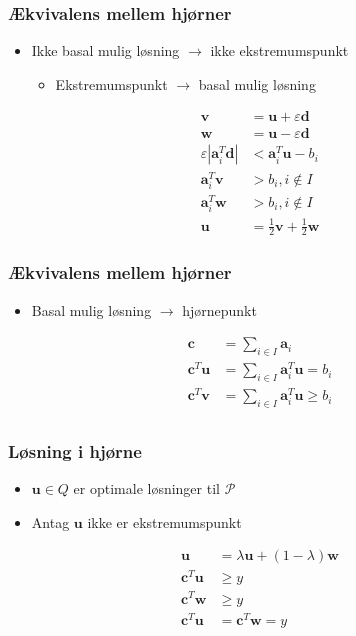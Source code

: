 \begin{frame}
\frametitle{Ækvivalens mellem hjørner}
\begin{itemize}
\item Ikke basal mulig løsning $\rightarrow$ ikke ekstremumspunkt
%
\begin{itemize}
\item Ekstremumspunkt $\rightarrow$ basal mulig løsning
\end{itemize}
\end{itemize}
%
\begin{align*}
\textbf{v} &= \textbf{u} + \varepsilon\textbf{d}\\
\textbf{w} &= \textbf{u} - \varepsilon\textbf{d}\\
\varepsilon|\textbf{a}_i^T\textbf{d}| &< \textbf{a}_i^T\textbf{u}-b_i\\
\textbf{a}_i^T\textbf{v} &> b_i, i\notin I\\
\textbf{a}_i^T\textbf{w} &> b_i, i\notin I\\
\textbf{u} &= \frac{1}{2}\textbf{v} + \frac{1}{2}\textbf{w}
\end{align*}
%
\end{frame}
%
%
\begin{frame}
\frametitle{Ækvivalens mellem hjørner}
\begin{itemize}
\item Basal mulig løsning $\rightarrow$ hjørnepunkt
\end{itemize}
%
\begin{align*}
\textbf{c} &= \sum_{i\in I} \textbf{a}_i\\
\textbf{c}^T\textbf{u} &= \sum_{i\in I} \textbf{a}_i^T\textbf{u} = 
 b_i\\
\textbf{c}^T\textbf{v} &= \sum_{i\in I} \textbf{a}_i^T\textbf{u} \geq 
 b_i\\
\end{align*}
\end{frame}
%
%
%
\begin{frame}
\frametitle{Løsning i hjørne}
\begin{itemize}
\item $\textbf{u} \in Q$ er optimale løsninger til $\mathcal{P}$
\item Antag $\textbf{u}$ ikke er ekstremumspunkt
\end{itemize}
%
\begin{align*}
\textbf{u} &= \lambda\textbf{u} + (1-\lambda)\textbf{w}\\
\textbf{c}^T\textbf{u} &\geq y\\
\textbf{c}^T\textbf{w} &\geq y\\
\textbf{c}^T\textbf{u} &= \textbf{c}^T\textbf{w} = y
\end{align*}
\end{frame}